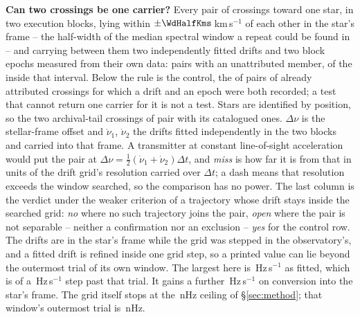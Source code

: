 \begin{table}
\centering
\caption{\textbf{Can two crossings be one carrier?} Every pair of crossings
toward one star, in two execution blocks, lying within
$\pm\WdHalfKms$\,km\,s$^{-1}$ of each other in the star's frame -- the
half-width of the median spectral window a repeat could be found in -- and
carrying between them two independently fitted drifts and two block epochs
measured from their own data: \TjNPair{} pairs with an unattributed member,
of the \TjNCandPair{} inside that interval. Below the rule is the control, the
\TjNCandAttrTest{} of \TjNCandAttr{} pairs of already attributed crossings for
which a drift and an epoch were both recorded; a test that cannot return one
carrier for it is not a test. Stars are
identified by position, so the two archival-tail crossings of \TjDeepStar{}
pair with its catalogued ones. $\Delta\nu$ is the stellar-frame offset and
$\dot\nu_1$, $\dot\nu_2$ the drifts fitted independently in the two blocks
and carried into that frame. A transmitter at constant line-of-sight
acceleration would put the pair at
$\Delta\nu=\frac{1}{2}(\dot\nu_1+\dot\nu_2)\Delta t$, and \emph{miss} is how
far it is from that in units of the drift grid's resolution carried over
$\Delta t$; a dash means that resolution exceeds the window searched, so the
comparison has no power. The last column is the verdict under the weaker
criterion of a trajectory whose drift stays inside the searched grid:
\emph{no} where no such trajectory joins the pair, \emph{open} where the pair
is not separable -- neither a confirmation nor an exclusion --
\emph{yes} for the control row. The drifts are in the star's frame while the grid was stepped in the
observatory's, and a fitted drift is refined inside one grid step, so a
printed value can lie beyond the outermost trial of its own window. The largest here is \TjGridTopoHzS\,Hz\,s$^{-1}$ as fitted, which is
\TjGridOverStep{} of a \TjGridStepHzS\,Hz\,s$^{-1}$ step past that trial. It
gains a further \TjGridFrameHzS\,Hz\,s$^{-1}$ on conversion into the star's
frame. The grid itself stops at the \DriftCeilLo\,nHz ceiling of
\S\ref{sec:method}; that window's outermost trial is \TjGridEdgeNHz\,nHz.}
\label{tab:pairs}
\scriptsize

\end{table}

